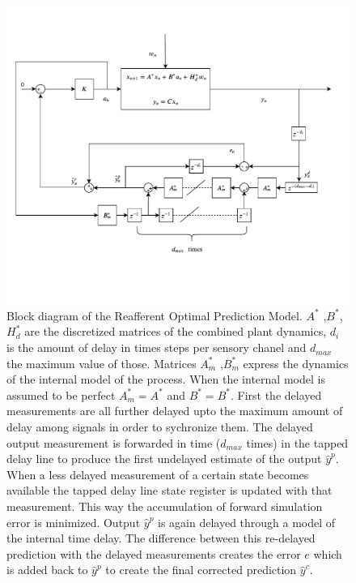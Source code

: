  \begin{figure}[ht]
    \centering

    \includegraphics[width=\linewidth,trim={0 2.8cm 0 2cm},clip]{images/VDROP_block.pdf}
    \caption{Block diagram of the Reafferent Optimal Prediction Model. \ensuremath{A^*} ,\ensuremath{B^*}, \ensuremath{H_d^*} are the discretized matrices of the combined plant dynamics, \ensuremath{d_i} is the amount of delay in times steps per sensory chanel and \ensuremath{d_{max}} the maximum value of those. Matrices \ensuremath{A_m^*} ,\ensuremath{B_m^*} express the dynamics of the internal model of the process. When the internal model is assumed to be perfect \ensuremath{A_m^*=A^*} and \ensuremath{B^*=B^*}. First the delayed measurements are all further delayed upto the maximum amount of delay among signals  in order to sychronize them.  The delayed output measurement  is forwarded in time (\ensuremath{d_{max}} times) in the tapped delay line to produce the first undelayed estimate of the output \ensuremath{\hat{y}^p}. When a less delayed measurement  of a certain state becomes available the tapped delay line  state register is updated with that measurement. This way the accumulation of forward simulation error is minimized. Output \ensuremath{\hat{y}^p} is again delayed through a model of the  internal time delay. The difference between this re-delayed prediction with the delayed measurements creates the error \ensuremath{e} which is added back to  \ensuremath{\hat{y}^p}  to create the final corrected prediction \ensuremath{\hat{y}^c}. }
    \label{fig:paper4}
\end{figure}

